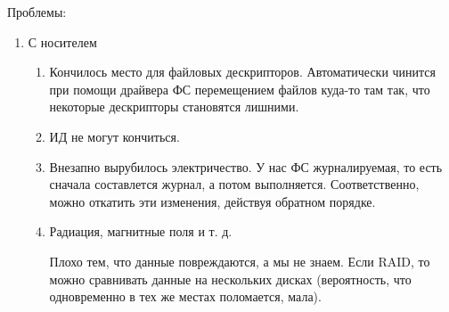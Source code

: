 \documentclass[a4paper,10pt]{article}
\begin{document}
Проблемы:
\begin{enumerate}
 \item С носителем
\begin{enumerate}
 \item Кончилось место для файловых дескрипторов. Автоматически чинится при помощи драйвера ФС перемещением файлов куда-то там так, что некоторые дескрипторы становятся лишними. 
 \item ИД не могут кончиться.
 \item Внезапно вырубилось электричество.
 У нас ФС журналируемая, то есть сначала составлется журнал, а потом выполняется. Соответственно, можно откатить эти изменения, действуя  обратном порядке.
 \item Радиация, магнитные поля и т. д.
 
 Плохо тем, что данные повреждаются, а мы не знаем. Если RAID, то можно сравнивать данные на нескольких дисках (вероятность, что одновременно в тех же местах поломается, мала).
 

\end{enumerate}
\end{enumerate}
\end{document}

